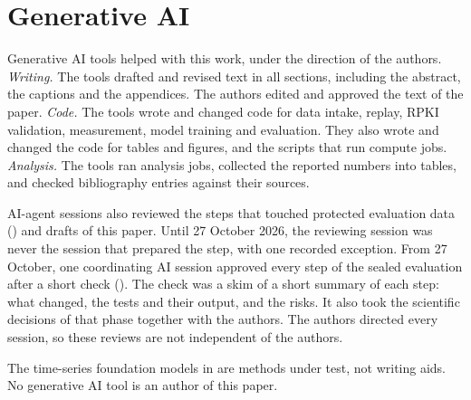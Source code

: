 \section{Generative AI}\label{sec:genai}
Generative AI tools helped with this work, under the direction of the authors.
\emph{Writing.} The tools drafted and revised text in all sections, including the abstract, the captions and the appendices.
The authors edited and approved the text of the paper.
\emph{Code.} The tools wrote and changed code for data intake, replay, RPKI validation, measurement, model training and evaluation.
They also wrote and changed the code for tables and figures, and the scripts that run compute jobs.
\emph{Analysis.} The tools ran analysis jobs, collected the reported numbers into tables, and checked bibliography entries against their sources.

AI-agent sessions also reviewed the steps that touched protected evaluation data () and drafts of this paper.
Until 27 October 2026, the reviewing session was never the session that prepared the step, with one recorded exception.
From 27 October, one coordinating AI session approved every step of the sealed evaluation after a short check ().
The check was a skim of a short summary of each step: what changed, the tests and their output, and the risks.
It also took the scientific decisions of that phase together with the authors.
The authors directed every session, so these reviews are not independent of the authors.

The time-series foundation models in  are methods under test, not writing aids.
No generative AI tool is an author of this paper.


